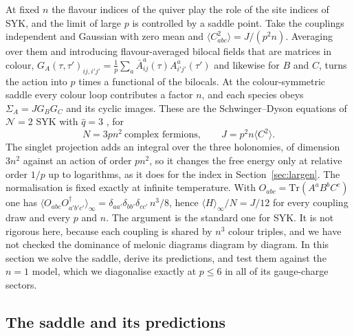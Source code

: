 \documentclass[10pt]{article}
\newcommand{\Tr}{\mathrm{Tr}}
\begin{document}
At fixed $n$ the flavour indices of the quiver play the role of the site indices of SYK, and the limit of large $p$
is controlled by a saddle point. Take the couplings independent and Gaussian with zero mean and
$\langle C_{abc}^2\rangle=J/(p^2n)$. Averaging over them and introducing flavour-averaged bilocal fields that are
matrices in colour, $G_A(\tau,\tau')_{ij,i'j'}=\frac1p\sum_a\bar A^a_{ij}(\tau)A^a_{i'j'}(\tau')$ and likewise for $B$
and $C$, turns the action into $p$ times a functional of the bilocals. At the colour-symmetric saddle every colour
loop contributes a factor $n$, and each species obeys $\Sigma_A=JG_BG_C$ and its cyclic images. These are the
Schwinger--Dyson equations of $\mathcal N=2$ SYK with $\hat q=3$ \cite{FGMS}, for
\begin{equation}
N=3pn^2\ \text{complex fermions},\qquad J=p^2n\langle C^2\rangle .
\label{eq:dictionary}
\end{equation}
The singlet projection adds an integral over the three holonomies, of dimension $3n^2$ against an action of order
$pn^2$, so it changes the free energy only at relative order $1/p$ up to logarithms, as it does for the index in
Section~\ref{sec:largen}. The normalisation is fixed exactly at infinite temperature. With
$O_{abc}=\Tr(A^aB^bC^c)$ one has $\langle O_{abc}O^\dagger_{a'b'c'}\rangle_\infty=\delta_{aa'}\delta_{bb'}\delta_{cc'}\,n^3/8$,
hence $\langle H\rangle_\infty/N=J/12$ for every coupling draw and every $p$ and $n$. The argument is the standard
one for SYK. It is not rigorous here, because each coupling is shared by $n^3$ colour triples, and we have not checked
the dominance of melonic diagrams diagram by diagram. In this section we solve the saddle, derive its predictions,
and test them against the $n=1$ model, which we diagonalise exactly at $p\le6$ in all of its gauge-charge sectors.

\subsection{The saddle and its predictions}
\end{document}
